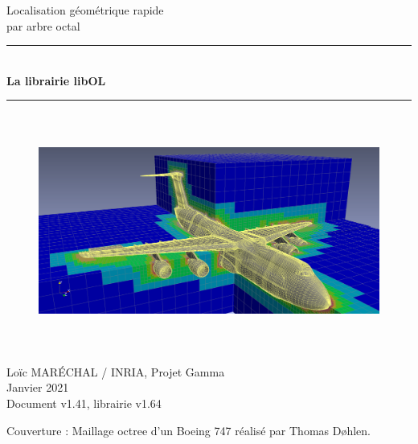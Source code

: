 \documentclass[a4paper,12pt]{article}
\newcommand{\HRule}{\rule{\linewidth}{1mm}}
\begin{document}
%
%

\begin{titlepage}

\begin{center}
\huge Localisation géométrique rapide \\ par arbre octal
\HRule \\
\medskip
{\Huge \bfseries La librairie libOL} \\
\HRule
\end{center}


\begin{figure}[htbp]
\begin{center}
\includegraphics[height=7.8cm]{octree_mesh.png}
\end{center}
\end{figure}


\begin{flushright}
\Large Lo\"ic MAR\'ECHAL / INRIA, Projet Gamma\\
\Large Janvier 2021 \\
\normalsize Document v1.41, librairie v1.64
\end{flushright}

\end{titlepage}

\clearpage

\setcounter{tocdepth}{2}
\tableofcontents
\vfill

\footnotesize{Couverture : Maillage octree d'un Boeing 747 réalisé par Thomas Døhlen.}
\normalsize

\clearpage


%
%
\end{document}
